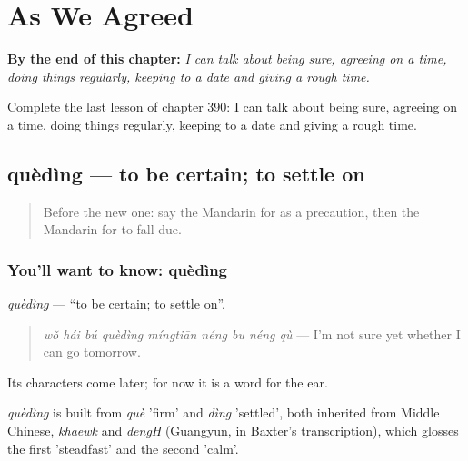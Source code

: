 
\chapter{As We Agreed}
\label{ch:zh-as-we-agreed}

\begin{chapteropening}
\textbf{By the end of this chapter:} \emph{I can talk about being sure, agreeing on a time, doing things regularly, keeping to a date and giving a rough time.}

Complete the last lesson of chapter 390: I can talk about being sure, agreeing on a time, doing things regularly, keeping to a date and giving a rough time.
\end{chapteropening}

\section[quèdìng]{quèdìng — to be certain; to settle on}

\label{lesson:ZH-C390-queding}



\begin{quote}
Before the new one: say the Mandarin for as a precaution, then the Mandarin for to fall due.
\end{quote}

\subsection*{You'll want to know: quèdìng}
\emph{quèdìng} — \textquotedblleft{}to be certain; to settle on\textquotedblright{}.

\begin{quote}
\emph{wǒ hái bú quèdìng míngtiān néng bu néng qù} — I'm not sure yet whether I can go tomorrow.
\end{quote}

Its characters come later; for now it is a word for the ear.

\begin{cousinweb}
\emph{quèdìng} is built from \emph{què} 'firm' and \emph{dìng} 'settled', both inherited from Middle Chinese, \emph{khaewk} and \emph{dengH} (Guangyun, in Baxter's transcription), which glosses the first 'steadfast' and the second 'calm'.
\end{cousinweb}

